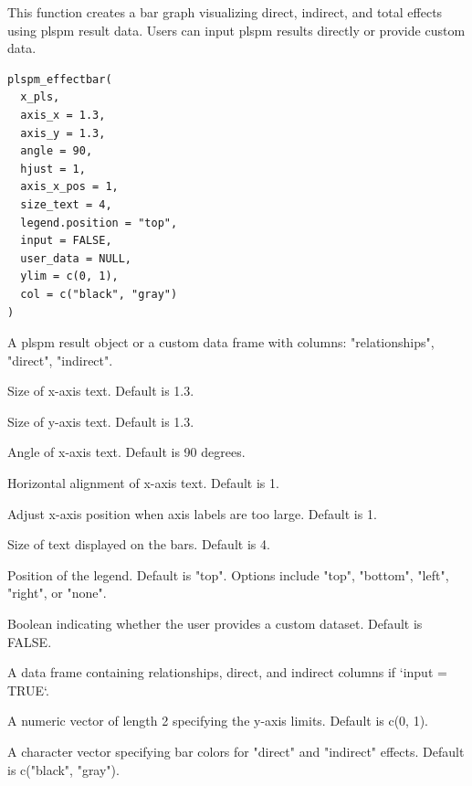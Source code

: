 \documentclass[a4paper]{book}
\begin{document}
%
\begin{Description}
This function creates a bar graph visualizing direct, indirect, and total effects
using plspm result data. Users can input plspm results directly or provide custom data.
\end{Description}
%
\begin{Usage}
\begin{verbatim}
plspm_effectbar(
  x_pls,
  axis_x = 1.3,
  axis_y = 1.3,
  angle = 90,
  hjust = 1,
  axis_x_pos = 1,
  size_text = 4,
  legend.position = "top",
  input = FALSE,
  user_data = NULL,
  ylim = c(0, 1),
  col = c("black", "gray")
)
\end{verbatim}
\end{Usage}
%
\begin{Arguments}
\begin{ldescription}
\item[\code{x\_pls}] A plspm result object or a custom data frame with columns: "relationships", "direct", "indirect".

\item[\code{axis\_x}] Size of x-axis text. Default is 1.3.

\item[\code{axis\_y}] Size of y-axis text. Default is 1.3.

\item[\code{angle}] Angle of x-axis text. Default is 90 degrees.

\item[\code{hjust}] Horizontal alignment of x-axis text. Default is 1.

\item[\code{axis\_x\_pos}] Adjust x-axis position when axis labels are too large. Default is 1.

\item[\code{size\_text}] Size of text displayed on the bars. Default is 4.

\item[\code{legend.position}] Position of the legend. Default is "top". Options include "top", "bottom", "left", "right", or "none".

\item[\code{input}] Boolean indicating whether the user provides a custom dataset. Default is FALSE.

\item[\code{user\_data}] A data frame containing relationships, direct, and indirect columns if `input = TRUE`.

\item[\code{ylim}] A numeric vector of length 2 specifying the y-axis limits. Default is c(0, 1).

\item[\code{col}] A character vector specifying bar colors for "direct" and "indirect" effects. Default is c("black", "gray").
\end{ldescription}
\end{Arguments}
\end{document}
